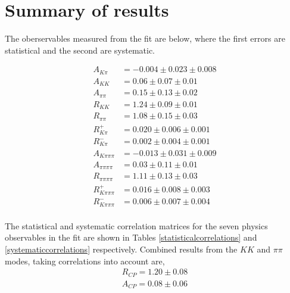 \section{Summary of results}
\label{sec:cpfit:summary}

The \CP oberservables measured from the fit are below, where the first errors are statistical and the second are systematic.

\begin{align*}
A_{K\pi} & = -0.004 \pm 0.023 \pm 0.008 \\
A_{KK} & = 0.06 \pm 0.07 \pm 0.01 \\
A_{\pi\pi} & = 0.15 \pm 0.13 \pm 0.02 \\
R_{KK} & = 1.24 \pm 0.09 \pm 0.01 \\
R_{\pi\pi} & = 1.08 \pm 0.15 \pm 0.03 \\
R^+_{K\pi} & = 0.020 \pm 0.006 \pm 0.001 \\
R^-_{K\pi} & = 0.002 \pm 0.004 \pm 0.001 \\
A_{K\pi\pi\pi} & = -0.013 \pm 0.031 \pm 0.009 \\
A_{\pi\pi\pi\pi} & = 0.03 \pm 0.11 \pm 0.01 \\
R_{\pi\pi\pi\pi} & = 1.11 \pm 0.13 \pm 0.03 \\
R^+_{K\pi\pi\pi} & = 0.016 \pm 0.008 \pm 0.003 \\
R^-_{K\pi\pi\pi} & = 0.006 \pm 0.007 \pm 0.004 \\
\end{align*}

The statistical and systematic correlation matrices for the seven physics observables in the fit are shown in Tables \ref{statisticalcorrelations} and \ref{systematiccorrelations} respectively. Combined results from the $KK$ and $\pi\pi$ modes, taking correlations into account are,
\begin{align*}
R_{CP} = 1.20 \pm 0.08 \\
A_{CP} = 0.08 \pm 0.06
\end{align*}

